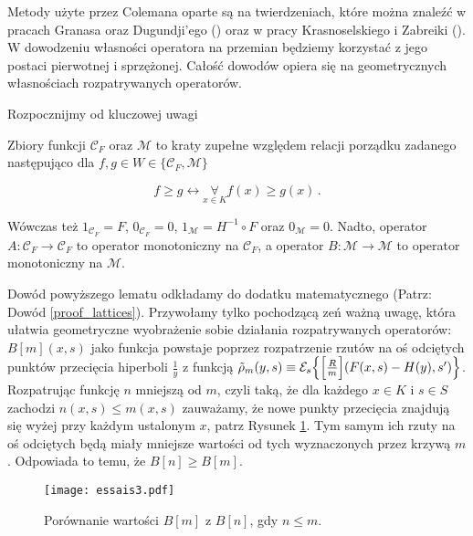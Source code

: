 Metody użyte przez Colemana oparte są na twierdzeniach, które można znaleźć w pracach Granasa oraz Dugundji'ego (\citeyear{Granas_FPT}) oraz w pracy Krasnoselskiego i Zabreiki (\citeyear{Krasno}). W dowodzeniu własności operatora na przemian będziemy korzystać z jego postaci pierwotnej i sprzężonej. Całość dowodów opiera się na geometrycznych własnościach rozpatrywanych operatorów.

Rozpocznijmy od kluczowej uwagi

\begin{lemat}\label{lemat_o_monotonicznosci}{ 
 
 Zbiory funkcji $ \mathcal{C}_F $ oraz $ \mathcal{M} $ to kraty zupełne względem relacji porządku zadanego następująco dla $ f,g \in W \in \{\mathcal{C}_F,\mathcal{M}  \} $
 
 $$ f \geq g \leftrightarrow \underset{x \in K}{\forall} f(x) \geq g(x)\,. $$

Wówczas też $ 1_{\mathcal{C}_F} = F $, $ 0_{\mathcal{C}_F} = 0 $, $ 1_{\mathcal{M}} = H^{-1}\circ F $ oraz $ 0_{\mathcal{M}} = 0 $. Nadto, operator $ A:\mathcal{C}_F \rightarrow \mathcal{C}_F $ to operator monotoniczny na $ \mathcal{C}_F $, a operator $ B:\mathcal{M} \rightarrow \mathcal{M} $ to operator monotoniczny na $ \mathcal{M} $.  
}\end{lemat}

Dowód powyższego lematu odkładamy do dodatku matematycznego (Patrz: Dowód \ref{proof_lattices}). Przywołamy tylko pochodzącą zeń ważną uwagę, która ułatwia geometryczne wyobrażenie sobie działania rozpatrywanych operatorów: $ B[m](x,s) $ jako funkcja powstaje poprzez rozpatrzenie rzutów na oś odciętych punktów przecięcia hiperboli $ \frac{1}{y} $ z funkcją $ \tilde{\rho}_m (y,s) \equiv \mathcal{E}_s \Bigl \{\Bigl[ \frac{R}{m} \Bigl] (F(x,s)- H(y), s') \Bigl \} $. Rozpatrując funkcję $n$ mniejszą od $ m $, czyli taką, że dla każdego $x \in K$ i $s\in S$ zachodzi $ n(x,s) \leq m(x,s) $ zauważamy, że nowe punkty przecięcia znajdują się wyżej przy każdym ustalonym $x $, patrz Rysunek \ref{rys2}. Tym samym ich rzuty na oś odciętych będą miały mniejsze wartości od tych wyznaczonych przez krzywą $m$. Odpowiada to temu, że $ B[n] \geq B[m] $. 


\begin{figure}
	\begin{center}
		\texttt{[image: essais3.pdf]} 
		\caption[Porównanie wartości $B\brackets{m}$ z $B\brackets{n}$, gdy $n \leq m$]{Porównanie wartości $B[m]$ z $B[n]$, gdy $n \leq m$. \\ }\label{rys2}
	\end{center}
\end{figure}

